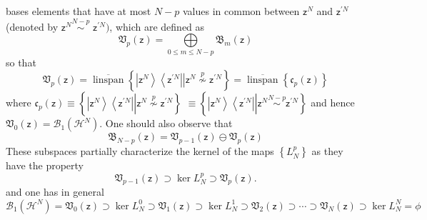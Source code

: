 \documentclass[aps,preprint]{revtex4}%
\begin{document}
bases elements that have at most $N-p$ values in common between $\mathsf{z}%
^{N}$ and $\mathsf{z}^{\prime N}$ (denoted by $\mathsf{z}^{N}\overset
{N-p}{\sim}$ $\mathsf{z}^{\prime N})$, which are defined as
\begin{equation}
\mathfrak{V}_{p}\left(  \mathsf{z}\right)  =%
{\displaystyle\bigoplus\limits_{0\leq m\leq N-p}}
\mathfrak{B}_{m}\left(  \mathsf{z}\right)
\end{equation}
so that
\begin{equation}
\mathfrak{V}_{p}\left(  \mathsf{z}\right)  =\overline{\operatorname{linspan}%
}\left\{  \left.  \left\vert \mathsf{z}^{N}\right\rangle \left\langle
\mathsf{z}^{\prime N}\right\vert \overset{}{}\right\vert \mathsf{z}%
^{N}\overset{p}{\nsim}\mathsf{z}^{\prime N}\right\}  =\overline
{\operatorname{linspan}}\left\{  \mathfrak{c}_{p}\left(  \mathsf{z}\right)
\right\}
\end{equation}
where $\mathfrak{c}_{p}\left(  \mathsf{z}\right)  \equiv\left\{  \left.
\underset{}{\left\vert \mathsf{z}^{N}\right\rangle \left\langle \mathsf{z}%
^{\prime N}\right\vert }\right\vert \mathsf{z}^{N}\overset{p}{\nsim}%
\mathsf{z}^{\prime N}\right\}  $ $\equiv\left\{  \left.  \underset
{}{\left\vert \mathsf{z}^{N}\right\rangle \left\langle \mathsf{z}^{\prime
N}\right\vert }\right\vert \mathsf{z}^{N}\overset{N-p}{\sim}\mathsf{z}^{\prime
N}\right\}  $ and hence $\mathfrak{V}_{0}\left(  \mathsf{z}\right)
=\mathcal{B}_{1}\left(  \mathcal{H}^{N}\right)  $. One should also observe
that
\begin{equation}
\mathfrak{B}_{N-p}\left(  \mathsf{z}\right)  =\mathfrak{V}_{p-1}\left(
\mathsf{z}\right)  \ominus\mathfrak{V}_{p}\left(  \mathsf{z}\right)
\end{equation}
These subspaces partially characterize the kernel of the maps $\left\{
L_{N}^{p}\right\}  $ as they have the property
\begin{equation}
\mathfrak{V}_{p-1}\left(  \mathsf{z}\right)  \supset\ker L_{N}^{p}%
\supset\mathfrak{V}_{p}\left(  \mathsf{z}\right)  .
\end{equation}
and one has in general%
\begin{equation}
\mathcal{B}_{1}\left(  \mathcal{H}^{N}\right)  =\mathfrak{V}_{0}\left(
\mathsf{z}\right)  \supset\ker L_{N}^{0}\supset\mathfrak{V}_{1}\left(
\mathsf{z}\right)  \supset\ker L_{N}^{1}\supset\mathfrak{V}_{2}\left(
\mathsf{z}\right)  \supset\cdots\supset\mathfrak{V}_{N}\left(  \mathsf{z}%
\right)  \supset\ker L_{N}^{N}=\phi
\end{equation}
\end{document}
